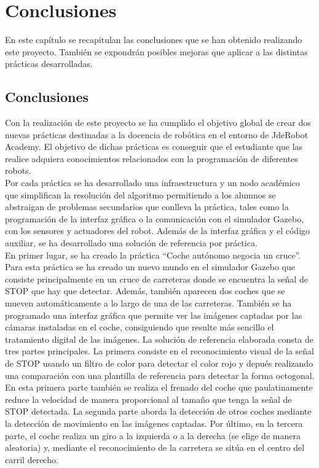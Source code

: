 \chapter{Conclusiones}\label{cap.conclusiones}
En este capítulo se recapitulan las conclusiones que se han obtenido realizando este proyecto. También se expondrán posibles mejoras que aplicar a las distintas prácticas desarrolladas.

\section{Conclusiones}

Con la realización de este proyecto se ha cumplido el objetivo global de crear dos nuevas prácticas destinadas a la docencia de robótica en el entorno de JdeRobot Academy. El objetivo de dichas prácticas es conseguir que el estudiante que las realice adquiera conocimientos relacionados con la programación de diferentes robots.\\

Por cada práctica se ha desarrollado una infraestructura y un nodo académico que simplifican la resolución del algoritmo permitiendo a los alumnos se abstraigan de problemas secundarios que conlleva la práctica, tales como la programación de la interfaz gráfica o la comunicación con el simulador Gazebo, con los sensores y actuadores del robot. Además de la interfaz gráfica y el código auxiliar, se ha desarrollado una solución de referencia por práctica.\\

En primer lugar, se ha creado la práctica ``Coche autónomo negocia un cruce''. Para esta práctica se ha creado un nuevo mundo en el simulador Gazebo que consiste principalmente en un cruce de carreteras donde se encuentra la señal de STOP que hay que detectar. Además, también aparecen dos coches que se mueven automáticamente a lo largo de una de las carreteras. También se ha programado una interfaz gráfica que permite ver las imágenes captadas por las cámaras instaladas en el coche, consiguiendo que resulte más sencillo el tratamiento digital de las imágenes. La solución de referencia elaborada consta de tres partes principales. La primera consiste en el reconocimiento visual de la señal de STOP usando un filtro de color para detectar el color rojo y depués realizando una comparación con una plantilla de referencia para detectar la forma octogonal. En esta primera parte también se realiza el frenado del coche que  paulatinamente reduce la velocidad de manera proporcional al tamaño que tenga la señal de STOP detectada. La segunda parte aborda la detección de otros coches mediante la detección de movimiento en las imágenes captadas. Por último, en la tercera parte, el coche realiza un giro a la izquierda o a la derecha (se elige de manera aleatoria) y, mediante el reconocimiento de la carretera se sitúa en el centro del carril derecho.\\


